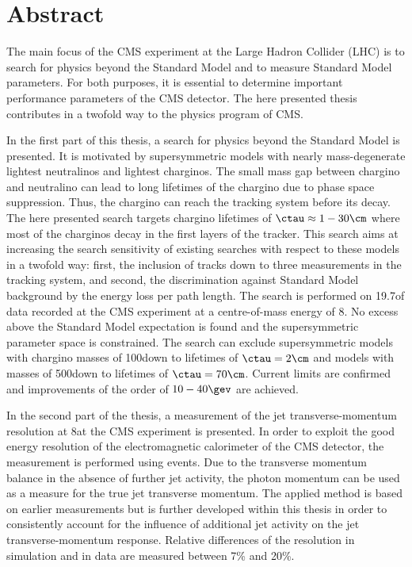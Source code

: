 \chapter*{Abstract}

The main focus of the CMS experiment at the Large Hadron Collider (LHC) is to search for physics beyond the Standard Model and to measure Standard Model parameters.
For both purposes, it is essential to determine important performance parameters of the CMS detector.
The here presented thesis contributes in a twofold way to the physics program of CMS.

In the first part of this thesis, a search for physics beyond the Standard Model is presented.
It is motivated by supersymmetric models with nearly mass-degenerate lightest neutralinos and lightest charginos.
The small mass gap between chargino and neutralino can lead to long lifetimes of the chargino due to phase space suppression.
Thus, the chargino can reach the tracking system before its decay.
The here presented search targets chargino lifetimes of $\ctau \approx 1 - 30\cm $ where most of the charginos decay in the first layers of the tracker. 
This search aims at increasing the search sensitivity of existing searches with respect to these models in a twofold way: first, the inclusion of tracks down to three measurements in the tracking system, and second, the discrimination against Standard Model background by the energy loss per path length.
The search is performed on 19.7\fbinv of data recorded at the CMS experiment at a centre-of-mass energy of 8\tev.
No excess above the Standard Model expectation is found and the supersymmetric parameter space is constrained.
The search can exclude supersymmetric models with chargino masses of 100\gev down to lifetimes of $\ctau=2\cm$ and models with masses of 500\gev down to lifetimes of $\ctau=70\cm$.
Current limits are confirmed and improvements of the order of $10-40\gev$ are achieved.

In the second part of the thesis, a measurement of the jet transverse-momentum resolution at 8\tev at the CMS experiment is presented.
In order to exploit the good energy resolution of the electromagnetic calorimeter of the CMS detector, the measurement is performed using \GAMJET events.
Due to the transverse momentum balance in the absence of further jet activity, the photon momentum can be used as a measure for the true jet transverse momentum. 
The applied method is based on earlier measurements but is further developed within this thesis in order to consistently account for the influence of additional jet activity on the jet transverse-momentum response.
Relative differences of the resolution in simulation and in data are measured between 7\% and 20\%. 

\cleardoublepage
